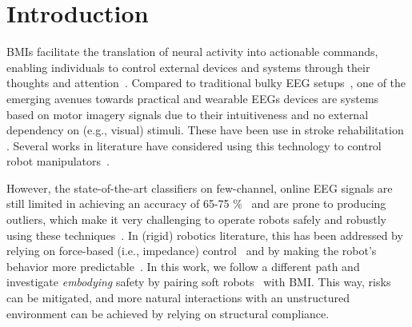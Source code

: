 \section{Introduction}
\glspl{BMI} \cite{liu2024cognitive} facilitate the translation of neural activity into actionable commands, enabling individuals to control external devices and systems through their thoughts and attention~\cite{coyle2007brain,lee2017brain}. Compared to traditional bulky EEG setups~\cite{van2012brain}, one of the emerging avenues towards practical and wearable \glspl{EEG} devices are systems based on motor imagery signals due to their intuitiveness and no external dependency on (e.g., visual) stimuli. These have been use in stroke rehabilitation \cite{khan2020review}. Several works in literature have considered using this technology to control robot manipulators~\cite{schiatti2017soft,aldini2019effect,lee2024noir}. %

However, the state-of-the-art classifiers on few-channel, online \gls{EEG} signals are still limited in achieving an accuracy of 65-75 \si{\percent}~\cite{arpaia2022non, lee2024noir} and are prone to producing outliers, which make it very challenging to operate robots safely and robustly using these techniques~\cite{liu2024cognitive}. In (rigid) robotics literature, this has been addressed by relying on force-based (i.e., impedance) control~\cite{schiatti2017soft} and by making the robot's behavior more predictable~\cite{aldini2019effect}.
%
%
In this work, we follow a different path and investigate \textit{embodying} safety by pairing soft robots~\cite{rus2015design, della2020softencyclopedia} 
with \gls{BMI}. This way, risks can be mitigated, and more natural interactions with an unstructured environment can be achieved by relying on structural compliance.

